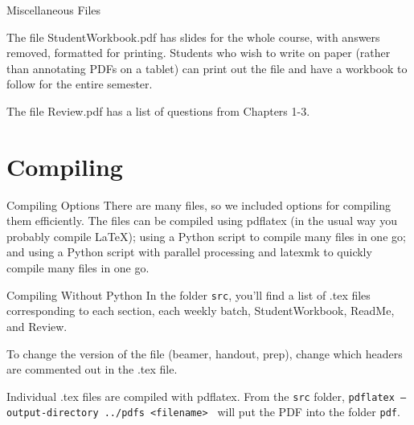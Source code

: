 \documentclass[10pt]{beamer}
\begin{document}
\begin{frame}{Miscellaneous Files}

The file StudentWorkbook.pdf has slides for the whole course, with answers removed, formatted for printing. Students who wish to write on paper (rather than annotating PDFs on a tablet) can print out the file and have a workbook to follow for the entire semester.\vfill

The file Review.pdf has a list of questions from Chapters 1-3.
\vfill

\end{frame}
\section{Compiling}
\frame{\tableofcontents[currentsection]}
\begin{frame}{Compiling Options}
There are many files, so we included options for compiling them efficiently. The files can be compiled using pdflatex (in the usual way you probably compile LaTeX); using a Python script to compile many files in one go; and using a Python script with parallel processing and latexmk to quickly compile many files in one go.
\end{frame}
\begin{frame}{Compiling Without Python}
In the folder \texttt{src}, you'll find a list of .tex files corresponding to each section, each weekly batch, StudentWorkbook, ReadMe, and Review. 
\vfill

To change the version of the file (beamer, handout, prep), change which headers are commented out in the .tex file.

\vfill

Individual .tex files are compiled with pdflatex. From the \texttt{src} folder, \texttt{pdflatex --output-directory ../pdfs  <filename> } will put the PDF into the folder \texttt{pdf}.
\end{frame}
\end{document}
